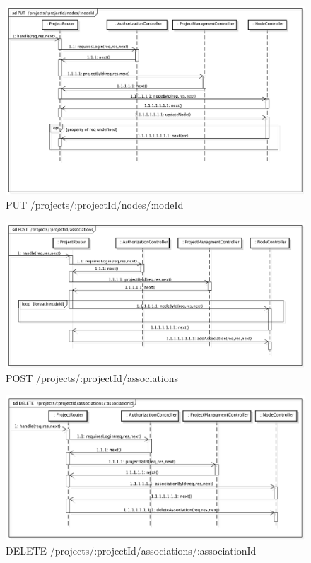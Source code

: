 \begin{center}
\begin{figure}[h]
\centering
\includegraphics[scale=0.35,keepaspectratio]{diagrammi/sequenza/BackEnd/putNod.pdf}
\caption{PUT  /projects/:projectId/nodes/:nodeId}
\end{figure}
\FloatBarrier
\end{center}
\label{postAss}
\begin{center}
\begin{figure}[h]
\centering
\includegraphics[scale=0.35,keepaspectratio]{diagrammi/sequenza/BackEnd/postAss.pdf}
\caption{POST  /projects/:projectId/associations}
\end{figure}
\FloatBarrier
\end{center}
\label{delAss}
\begin{center}
\begin{figure}[h]
\centering
\includegraphics[scale=0.35,keepaspectratio]{diagrammi/sequenza/BackEnd/delAss.pdf}
\caption{DELETE  /projects/:projectId/associations/:associationId}
\end{figure}
\FloatBarrier
\end{center}
